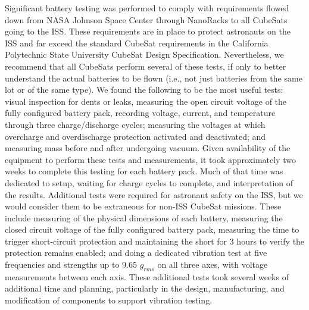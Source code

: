 Significant battery testing was performed to comply with requirements flowed down from NASA Johnson Space Center through NanoRacks to all CubeSats going to the ISS. These requirements are in place to protect astronauts on the ISS and far exceed the standard CubeSat requirements in the California Polytechnic State University CubeSat Design Specification. Nevertheless, we recommend that all CubeSats perform several of these tests, if only to better understand the actual batteries to be flown (i.e., not just batteries from the same lot or of the same type). We found the following to be the most useful tests: visual inspection for dents or leaks, measuring the open circuit voltage of the fully configured battery pack, recording voltage, current, and temperature through three charge/discharge cycles; measuring the voltages at which overcharge and overdischarge protection activated and deactivated; and measuring mass before and after undergoing vacuum. Given availability of the equipment to perform these tests and measurements, it took approximately two weeks to complete this testing for each battery pack. Much of that time was dedicated to setup, waiting for charge cycles to complete, and interpretation of the results. Additional tests were required for astronaut safety on the ISS, but we would consider them to be extraneous for non-ISS CubeSat missions. These include measuring of the physical dimensions of each battery, measuring the closed circuit voltage of the fully configured battery pack, measuring the time to trigger short-circuit protection and maintaining the short for 3 hours to verify the protection remains enabled; and doing a dedicated vibration test at five frequencies and strengths up to 9.65 $g_{rms}$ on all three axes, with voltage measurements between each axis. These additional tests took several weeks of additional time and planning, particularly in the design, manufacturing, and modification of components to support vibration testing.

